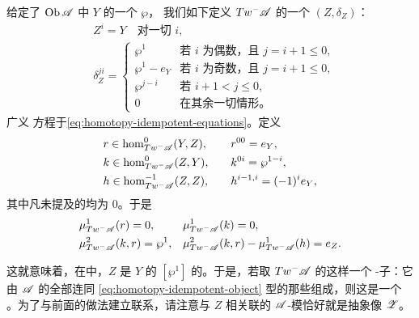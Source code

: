 给定了 $\operatorname{Ob}\mathscr{A}$ 中\trObject{} $Y$ 的一个\trHomotopy\trIdempotent{} $\wp$，
我们如下定义 $Tw^-\mathscr{A}$ 的一个\trObject{} $(Z,\delta_Z)$：
\begin{equation}\label{eq:homotopy-idempotent-object}
\begin{aligned}
&Z^i=Y\quad\text{对一切 }i,\\
&\delta_Z^{ji}=
\begin{cases}
\wp^1 & \text{若 } i \text{ 为偶数，且 } j=i+1\le 0,\\
\wp^1-e_Y & \text{若 } i \text{ 为奇数，且 } j=i+1\le 0,\\
\wp^{j-i} & \text{若 } i+1<j\le 0,\\
0 & \text{在其余一切情形。}
\end{cases}
\end{aligned}
\end{equation}
广义 \trMaurerCartan{}方程\trEquivalence{}于\eqref{eq:homotopy-idempotent-equations}。定义
\begin{equation*}
\begin{aligned}
&r\in\hom^0_{Tw^-\mathscr{A}}(Y,Z),\quad &&r^{00}=e_Y,\\
&k\in\hom^0_{Tw^-\mathscr{A}}(Z,Y),\quad &&k^{0i}=\wp^{1-i},\\
&h\in\hom^{-1}_{Tw^-\mathscr{A}}(Z,Z),\quad &&h^{i-1,i}=(-1)^i e_Y,
\end{aligned}
\end{equation*}
其中凡未提及的\trCoefficients{}均为 $0$。于是
\begin{equation*}
\begin{aligned}
&\mu^1_{Tw^-\mathscr{A}}(r)=0, &&\mu^1_{Tw^-\mathscr{A}}(k)=0,\\
&\mu^2_{Tw^-\mathscr{A}}(k,r)=\wp^1,
&&\mu^2_{Tw^-\mathscr{A}}(k,r)-\mu^1_{Tw^-\mathscr{A}}(h)=e_Z.
\end{aligned}
\end{equation*}

这就意味着，在\trCohomology\trCategory{}中，$Z$ 是 $Y$ 的\trIdempotent{}%
\trEndomorphism{} $[\wp^1]$ 的\trImage。于是，若取 $Tw^-\mathscr{A}$ 的这样一个%
\trFull{} \trAinfty-子\trCategory：它由 $\mathscr{A}$ 的全部\trObject{}连同
\eqref{eq:homotopy-idempotent-object} 型的那些\trObject{}组成，则这是一个%
\trSplitClosure。为了与前面的做法建立联系，请注意与 $Z$ 相关联的%
\trYoneda{} $\mathscr{A}$-模恰好就是抽象像 $\mathscr{Z}$。
